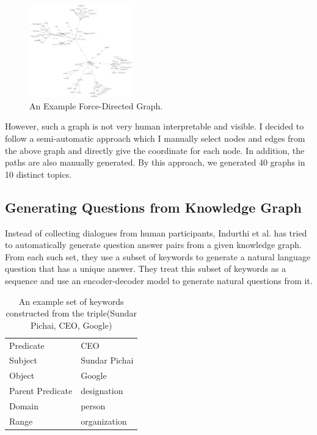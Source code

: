 \documentclass[bsc,frontabs,twoside,singlespacing,parskip,deptreport]{infthesis}     %
\begin{document}
\begin{figure}[h]
    \centering
    \includegraphics[width=0.4\textwidth]{directed.png}
    \caption{An Example Force-Directed Graph.}
    \label{fig:obama}
\end{figure}

However, such a graph is not very human interpretable and visible. I decided to follow a semi-automatic approach which I manually select nodes and edges from the above graph and directly give the coordinate for each node. In addition, the paths are also manually generated. By this approach, we generated 40 graphs in 10 distinct topics.

\subsection{Generating Questions from Knowledge Graph}

Instead of collecting dialogues from human participants, Indurthi et al.\cite{indurthi2017generating} has tried to automatically generate question answer pairs from a given knowledge graph. From each such set, they use a subset of keywords to generate a natural language question that has a unique answer. They treat this subset of keywords as a sequence and use an encoder-decoder model to generate natural questions from it.


\begin{table}[]
\centering
\begin{tabular}{|l|l|}
\hline
Predicate        & CEO           \\
Subject          & Sundar Pichai \\
Object           & Google        \\
Parent Predicate & designation   \\
Domain           & person        \\
Range            & organization  \\ \hline
\end{tabular}
\caption{An example set of keywords constructed from the triple(Sundar Pichai, CEO, Google)\cite{indurthi2017generating}}
\label{tab:keyword}
\end{table}
\end{document}
